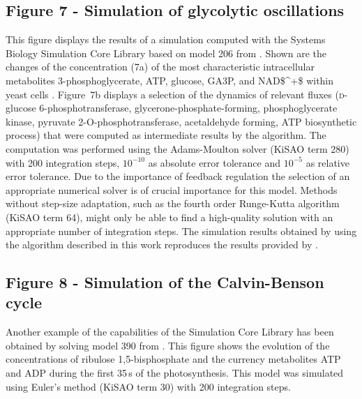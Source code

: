 \documentclass[10pt]{bmc_article}
\newenvironment{bmcformat}{\begin{raggedright}\baselineskip20pt\sloppy\setboolean{publ}{false}}{\end{raggedright}\baselineskip20pt\sloppy}
\begin{document}
\begin{bmcformat}
\subsection*{Figure 7 - Simulation of glycolytic oscillations}
This figure displays the results of a simulation computed with the Systems
Biology Simulation Core Library based on model \COR{\numero} 206 from 
\cite{Novere2006a, Wolf2000}.
Shown are the changes of the concentration (7a) of the most characteristic
intracellular metabolites 3-phosphoglycerate, \acs{ATP}, glucose, \acf{GA3P},
and \acs{NAD$^+$} within yeast cells .
Figure~7b displays a selection of the dynamics of relevant fluxes 
(\textsc{d}-glucose 6-phosphotransferase, glycerone-phosphate-forming,
phosphoglycerate kinase, pyruvate 2-O-phosphotransferase, acetaldehyde forming,
\acs{ATP} biosynthetic process)
that were computed as intermediate results by the algorithm.
The computation was performed using the Adams-Moulton solver \cite{Hairer2000}
(\acs{KiSAO} term 280) with 200 integration steps, $10^{-10}$ as absolute error
tolerance and $10^{-5}$ as relative error tolerance.
Due to the importance of feedback regulation the selection of an appropriate
numerical solver is of crucial importance for this model.
Methods without step-size adaptation, such as the fourth order Runge-Kutta
algorithm (\acs{KiSAO} term 64), might only be able to find a high-quality
solution  with an appropriate number of integration steps. 
The simulation results obtained by using the algorithm described in this work
reproduces the results provided by
.

\subsection*{Figure 8 - Simulation of the Calvin-Benson cycle}
Another example of the capabilities of the Simulation Core Library has been
obtained by solving model \COR{\numero} 390 from
\cite{Novere2006a, Arnold2011}.
This figure shows the evolution of the concentrations of ribulose 
1,5-bisphosphate
and the currency metabolites \acs{ATP} and \acs{ADP} during the first 35\,s of
the photosynthesis.
This model was simulated using Euler's method (\acs{KiSAO} term 30) with 200
integration steps.



\end{bmcformat}
\end{document}
